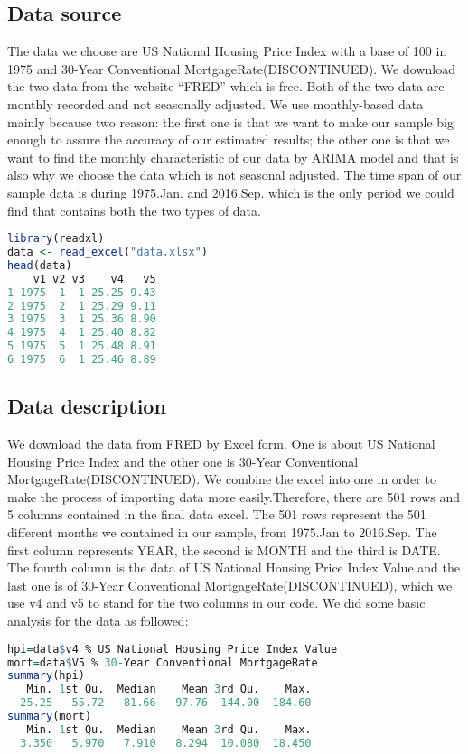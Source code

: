 \documentclass[12pt,letterpaper]{article}
\begin{document}
\subsection{Data source}
The data we choose are US National Housing Price Index with a base of 100 in 1975 and 30-Year Conventional MortgageRate(DISCONTINUED). 
We download the two data from the website ``FRED'' which is free. 
Both of the two data are monthly recorded and not seasonally adjusted. 
We use monthly-based data mainly because two reason: the first one is that we want to make our sample big enough to assure the accuracy of our estimated results; the other one is that we  want to find the monthly characteristic of our data by ARIMA model and that is also why we choose the data which is not seasonal adjusted.
The time span of our sample data is during 1975.Jan. and 2016.Sep. which is the only period we could find that contains both the two types of data.

{\footnotesize
\begin{lstlisting}[language=R]
library(readxl)
data <- read_excel("data.xlsx")
head(data)
    v1 v2 v3    v4   v5
1 1975  1  1 25.25 9.43
2 1975  2  1 25.29 9.11
3 1975  3  1 25.36 8.90
4 1975  4  1 25.40 8.82
5 1975  5  1 25.48 8.91
6 1975  6  1 25.46 8.89
\end{lstlisting}
}

\subsection{Data description}
We download the data from FRED by Excel form. One is about US National Housing Price Index and the other one is 30-Year Conventional MortgageRate(DISCONTINUED).
We combine the excel into one in order to make the process of importing data more easily.Therefore, there are 501 rows and 5 columns contained in the final data excel.
The 501 rows represent the 501 different months we contained in our sample, from 1975.Jan to 2016.Sep.
The first column represents YEAR, the second is MONTH and the third is DATE.
The fourth column is the data of US National Housing Price Index Value and the last one is of 30-Year Conventional MortgageRate(DISCONTINUED), which we use v4 and v5 to stand for the two columns in our code.
We did some basic analysis for the data as followed:

{\footnotesize
\begin{lstlisting}[language=R]
hpi=data$v4 % US National Housing Price Index Value
mort=data$V5 % 30-Year Conventional MortgageRate
summary(hpi)
   Min. 1st Qu.  Median    Mean 3rd Qu.    Max. 
  25.25   55.72   81.66   97.76  144.00  184.60 
summary(mort)
   Min. 1st Qu.  Median    Mean 3rd Qu.    Max. 
  3.350   5.970   7.910   8.294  10.080  18.450
\end{lstlisting}
}
         
\end{document}
